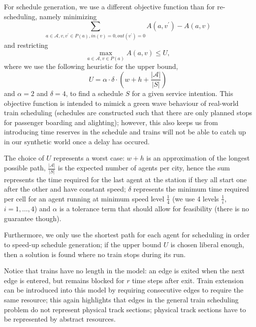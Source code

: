 \documentclass{article}
\begin{document}
For schedule generation, we use a different objective function than for re-scheduling, namely minimizing
\begin{equation}
\sum_{a \in \mathcal{A}, v,v^\prime \in P(a), in(v)=0, out(v^\prime)=0} A(a,v^\prime) - A(a,v)
\end{equation}
and restricting
\begin{equation}
\max_{a \in \mathcal{A}, v \in P(a)} A(a,v) \leq U,
\end{equation}
where we use the following heuristic for the upper bound,
\begin{equation}
U=\alpha \cdot \delta \cdot  \left(w + h + \frac{\left|\mathcal{A}\right|}{\left| S \right|} \right)
\end{equation}
and $\alpha=2$ and $\delta=4$,
to find a schedule $S$ for a given service intention. This objective function is intended to mimick a green wave behaviour of real-world train scheduling (schedules are constructed such that there are only planned stops for passenger boarding and alighting); however, this also keeps us from introducing time reserves in the schedule and trains will not be able to catch up in our synthetic world once a delay has occured.


The choice of $U$ represents a worst case:
$w+h$ is an approximation of the longest possible path, $\frac{\left|\mathcal{A}\right|}{\left| S \right|}$ is the expected number of agents per city, hence the sum represents the time required for the last agent at the station if they all start one after the other and have constant speed; $\delta$ represents the minimum time required per cell for an agent running at minimum speed level $\frac{1}{4}$ (we use 4 levels $\frac{1}{i}$, $i=1,\ldots,4$) and $\alpha$ is a tolerance term that should allow for feasibility (there is no guarantee though).


Furthermore, we only use the shortest path for each agent for scheduling in order to speed-up schedule generation; if the upper bound $U$ is chosen liberal enough, then a solution is found where no train stops during its run.


Notice that trains have no length in the model: an edge is exited when the next edge is entered, but remains blocked for $r$ time steps after exit. Train extension can be introduced into this model by requiring consecutive edges to require the same resource; this again highlights that edges in the general train scheduling problem do not represent physical track sections; physical track sections have to be represented by abstract resources.
\end{document}
